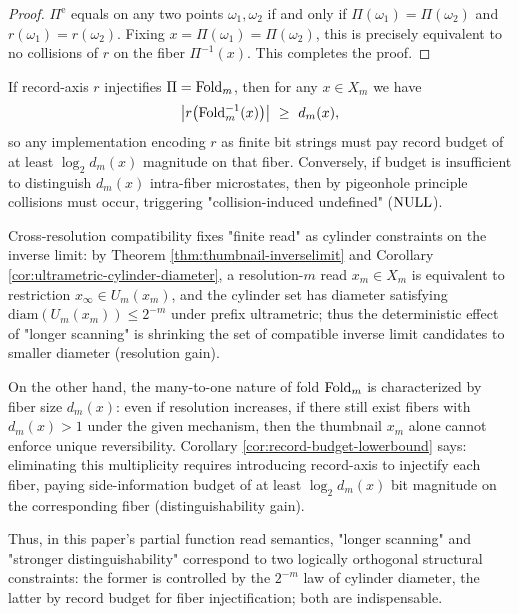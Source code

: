 \begin{proof}
$\Pi^{\mathrm e}$ equals on any two points $\omega_1,\omega_2$ if and only if $\Pi(\omega_1)=\Pi(\omega_2)$ and $r(\omega_1)=r(\omega_2)$. Fixing $x=\Pi(\omega_1)=\Pi(\omega_2)$, this is precisely equivalent to no collisions of $r$ on the fiber $\Pi^{-1}(x)$. This completes the proof.\par
\end{proof}

\begin{corollary}\label{cor:record-budget-lowerbound}
If record-axis $r$ injectifies $\Pi=\mathrm{Fold}_m$, then for any $x\in X_m$ we have
$$
\card{r\!\left(\Fold_m^{-1}(x)\right)}\ \ge\ d_m(x),
$$
so any implementation encoding $r$ as finite bit strings must pay record budget of at least $\log_2 d_m(x)$ magnitude on that fiber. Conversely, if budget is insufficient to distinguish $d_m(x)$ intra-fiber microstates, then by pigeonhole principle collisions must occur, triggering "collision-induced undefined" ($\mathrm{NULL}$).\par
\end{corollary}

\begin{remark}
Cross-resolution compatibility fixes "finite read" as cylinder constraints on the inverse limit: by Theorem \ref{thm:thumbnail-inverselimit} and Corollary \ref{cor:ultrametric-cylinder-diameter}, a resolution-$m$ read $x_m\in X_m$ is equivalent to restriction $x_\infty\in U_m(x_m)$, and the cylinder set has diameter satisfying $\mathrm{diam}(U_m(x_m))\le 2^{-m}$ under prefix ultrametric; thus the deterministic effect of "longer scanning" is shrinking the set of compatible inverse limit candidates to smaller diameter (resolution gain).\par
On the other hand, the many-to-one nature of fold $\mathrm{Fold}_m$ is characterized by fiber size $d_m(x)$: even if resolution increases, if there still exist fibers with $d_m(x)>1$ under the given mechanism, then the thumbnail $x_m$ alone cannot enforce unique reversibility. Corollary \ref{cor:record-budget-lowerbound} says: eliminating this multiplicity requires introducing record-axis to injectify each fiber, paying side-information budget of at least $\log_2 d_m(x)$ bit magnitude on the corresponding fiber (distinguishability gain).\par
Thus, in this paper's partial function read semantics, "longer scanning" and "stronger distinguishability" correspond to two logically orthogonal structural constraints: the former is controlled by the $2^{-m}$ law of cylinder diameter, the latter by record budget for fiber injectification; both are indispensable.\par
\end{remark}


